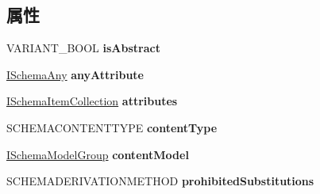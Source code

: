 \subsection*{属性}
\begin{DoxyCompactItemize}
\item 
\mbox{\label{interface_m_s_x_m_l2_1_1_i_schema_complex_type_aafc54937c92c5afb03599e4c307242a3}} 
V\+A\+R\+I\+A\+N\+T\+\_\+\+B\+O\+OL {\bfseries is\+Abstract}
\item 
\mbox{\label{interface_m_s_x_m_l2_1_1_i_schema_complex_type_a794f4609add7a42ccae5ac88c3998652}} 
\hyperlink{interface_m_s_x_m_l2_1_1_i_schema_any}{I\+Schema\+Any} {\bfseries any\+Attribute}
\item 
\mbox{\label{interface_m_s_x_m_l2_1_1_i_schema_complex_type_a475510ca221784e86703d17d3431be2c}} 
\hyperlink{interface_m_s_x_m_l2_1_1_i_schema_item_collection}{I\+Schema\+Item\+Collection} {\bfseries attributes}
\item 
\mbox{\label{interface_m_s_x_m_l2_1_1_i_schema_complex_type_aa19fc5279eadbb15d73e00b8c0ea36f0}} 
S\+C\+H\+E\+M\+A\+C\+O\+N\+T\+E\+N\+T\+T\+Y\+PE {\bfseries content\+Type}
\item 
\mbox{\label{interface_m_s_x_m_l2_1_1_i_schema_complex_type_a66edde4f9228011e8c8ce34a0fb7a89e}} 
\hyperlink{interface_m_s_x_m_l2_1_1_i_schema_model_group}{I\+Schema\+Model\+Group} {\bfseries content\+Model}
\item 
\mbox{\label{interface_m_s_x_m_l2_1_1_i_schema_complex_type_af06c64a8a743ce68fca9409ddefb00b5}} 
S\+C\+H\+E\+M\+A\+D\+E\+R\+I\+V\+A\+T\+I\+O\+N\+M\+E\+T\+H\+OD {\bfseries prohibited\+Substitutions}
\end{DoxyCompactItemize}
